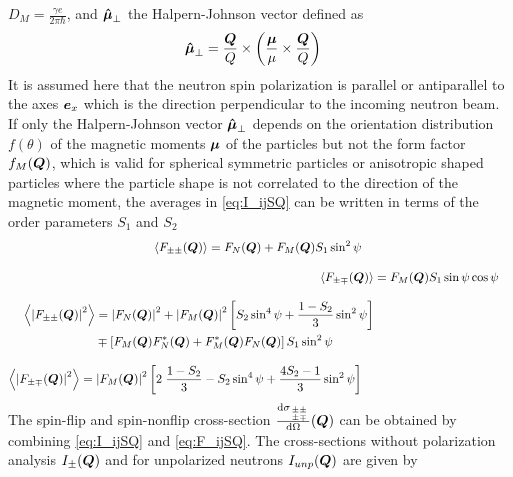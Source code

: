 $D_M=\frac{\gamma e}{2\pi\hbar}$, and $\BM{\hat{\mu}}_\perp$ the Halpern-Johnson vector defined as
\begin{align}
\BM{\hat{\mu}}_\perp &= \frac{\BM{Q}}{Q}\times\left(\frac{\BM{\mu}}{\mu}\times\frac{\BM{Q}}{Q}\right)
\end{align}
It is assumed here that the neutron spin polarization is parallel or antiparallel to the axes $\BM{e}_x$
which is the direction perpendicular to the incoming neutron beam.
If only the Halpern-Johnson vector $\BM{\hat{\mu}}_\perp$ depends on the orientation distribution $f(\theta)$ of the
magnetic moments $\BM{\mu}$ of the particles but not the form factor $f_M(\BM{Q})$, which is valid
for spherical symmetric particles or anisotropic shaped particles where the particle shape is not
correlated to the direction of the magnetic moment, the averages in \ref{eq:I_ijSQ}
can be written in terms of the order parameters $S_1$ and $S_2$
\begin{subequations}
\label{eq:F_ijSQ}
\begin{align}
\begin{split}
\left\langle F_{\pm\pm}(\BM{Q})\right\rangle &=  F_N(\BM{Q}) +F_M(\BM{Q})S_1\sin^2\psi
\end{split} \\[3mm]
\left\langle F_{\pm\mp}(\BM{Q})\right\rangle &= F_M(\BM{Q})S_1\sin\psi\cos\psi  \\[3mm]
\begin{split}
\left\langle \abs{F_{\pm\pm}(\BM{Q})}^2\right\rangle &= \abs{F_N(\BM{Q})}^2+\abs{F_M(\BM{Q})}^2 \left[S_2 \sin^4\psi+ \frac{1-S_2}{3} \sin^2\psi\right] \\
                                       & \mp \left[F_M(\BM{Q})F^*_N(\BM{Q})+F^*_M(\BM{Q})F_N(\BM{Q})\right]S_1\sin^2\psi
\end{split} \\[3mm]
\begin{split}
\left\langle \abs{F_{\pm\mp}(\BM{Q})}^2\right\rangle &=\abs{F_M(\BM{Q})}^2 \left[2\;\frac{1-S_2}{3}-S_2\sin^4\psi+\frac{4S_2-1}{3}\sin^2\psi\right]
\end{split}
\end{align}
\end{subequations}
The spin-flip and spin-nonflip cross-section $\frac{\mathrm{d}\sigma_{{\pm\pm}\atop{\pm\mp}}}{\mathrm{d}\Omega}(\BM{Q})$
can be obtained by combining \ref{eq:I_ijSQ} and \ref{eq:F_ijSQ}. The cross-sections
without polarization analysis $I_\pm(\BM{Q})$ and for unpolarized neutrons $I_{unp}(\BM{Q})$ are given by
